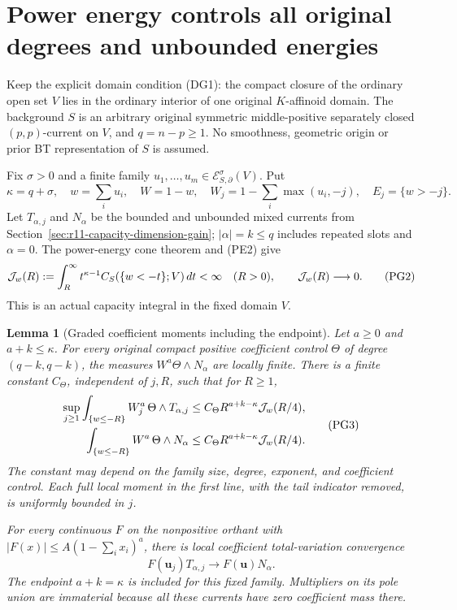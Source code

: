 \documentclass[11pt,a4paper]{article}
\numberwithin{equation}{section}
\newtheorem{lemma}[theorem]{Lemma}
\theoremstyle{definition}
\theoremstyle{remark}
\begin{document}


\section{Power energy controls all original degrees and unbounded energies}
\label{sec:r11-power-all-degree}

Keep the explicit domain condition (DG1): the compact closure of
the ordinary open set $V$ lies in the ordinary interior of one
original $K$-affinoid domain. The background $S$ is an arbitrary
original symmetric middle-positive separately closed $(p,p)$-current
on $V$, and $q=n-p\geq1$. No smoothness, geometric origin or prior
BT representation of $S$ is assumed.

Fix $\sigma>0$ and a finite family
$u_1,\ldots,u_m\in\mathcal E^\sigma_{S,\partial}(V)$. Put
\[
 \kappa=q+\sigma,\quad w=\sum_i u_i,\quad W=1-w,\quad
 W_j=1-\sum_i\max(u_i,-j),\quad E_j=\{w>-j\}.
 \tag{PG1}
\]
Let $T_{\alpha,j}$ and $N_\alpha$ be the bounded and unbounded
mixed currents from Section~\ref{sec:r11-capacity-dimension-gain};
$|\alpha|=k\leq q$ includes repeated slots and $\alpha=0$.
The power-energy cone theorem and (PE2) give
\[
 {\cal J}_w(R):=\int_R^\infty
       t^{\kappa-1}C_S(\{w<-t\};V)\,dt<\infty
       \quad(R>0),\qquad {\cal J}_w(R)\longrightarrow0.
 \tag{PG2}
\]
This is an actual capacity integral in the fixed domain $V$.

\begin{lemma}[Graded coefficient moments including the endpoint]
\label{lem:r11-graded-curvature-moments}
Let $a\geq0$ and $a+k\leq\kappa$. For every original compact
positive coefficient control $\Theta$ of degree $(q-k,q-k)$,
the measures $W^a\Theta\wedge N_\alpha$ are locally finite.
There is a finite constant $C_\Theta$, independent of $j,R$, such
that for $R\geq1$,
\[
 \begin{split}
 \sup_{j\geq1}\int_{\{w\leq-R\}}W_j^a\,
                           \Theta\wedge T_{\alpha,j}
     &\leq C_\Theta R^{a+k-\kappa}{\cal J}_w(R/4),\\
 \int_{\{w\leq-R\}}W^a\,\Theta\wedge N_\alpha
     &\leq C_\Theta R^{a+k-\kappa}{\cal J}_w(R/4).
 \end{split}
 \tag{PG3}
\]
The constant may depend on the family size, degree, exponent,
and coefficient control. Each full local moment in the first
line, with the tail indicator removed, is uniformly bounded in $j$.

For every continuous $F$ on the nonpositive orthant with
$|F(x)|\leq A(1-\sum_i x_i)^a$, there is local coefficient
total-variation convergence
\[
               F(\mathbf u_j)T_{\alpha,j}
                          \longrightarrow F(\mathbf u)N_\alpha.
 \tag{PG4}
\]
The endpoint $a+k=\kappa$ is included for this fixed family.
Multipliers on its pole union are immaterial because all these
currents have zero coefficient mass there.
\end{lemma}
\end{document}
